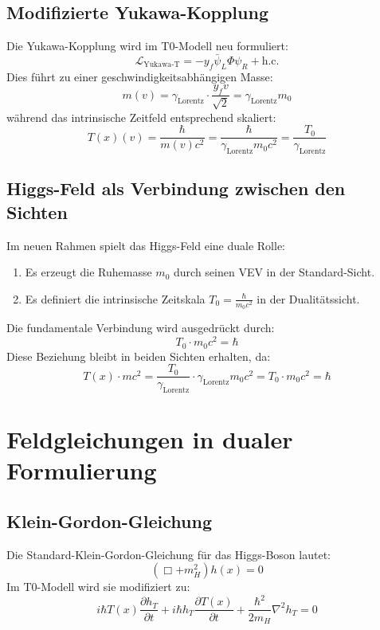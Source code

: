 \documentclass[a4paper,12pt]{article}
\newcommand{\Tfield}{T(x)}
\newcommand{\Tzero}{T_0}
\newcommand{\gammaf}{\gamma_{\text{Lorentz}}}
\begin{document}
	\subsection{Modifizierte Yukawa-Kopplung}
	Die Yukawa-Kopplung wird im T0-Modell neu formuliert:
	\begin{equation}
		\mathcal{L}_{\text{Yukawa-T}} = -y_f \bar{\psi}_L \Phi \psi_R + \text{h.c.}
	\end{equation}
	Dies führt zu einer geschwindigkeitsabhängigen Masse:
	\begin{equation}
		m(v) = \gammaf \cdot \frac{y_f v}{\sqrt{2}} = \gammaf m_0
	\end{equation}
	während das intrinsische Zeitfeld entsprechend skaliert:
	\begin{equation}
		\Tfield(v) = \frac{\hbar}{m(v)c^2} = \frac{\hbar}{\gammaf m_0 c^2} = \frac{\Tzero}{\gammaf}
	\end{equation}
	
	\subsection{Higgs-Feld als Verbindung zwischen den Sichten}
	Im neuen Rahmen spielt das Higgs-Feld eine duale Rolle:
	\begin{enumerate}
		\item Es erzeugt die Ruhemasse \( m_0 \) durch seinen VEV in der Standard-Sicht.
		\item Es definiert die intrinsische Zeitskala \( \Tzero = \frac{\hbar}{m_0 c^2} \) in der Dualitätssicht.
	\end{enumerate}
	Die fundamentale Verbindung wird ausgedrückt durch:
	\begin{equation}
		\Tzero \cdot m_0 c^2 = \hbar
	\end{equation}
	Diese Beziehung bleibt in beiden Sichten erhalten, da:
	\begin{equation}
		\Tfield \cdot m c^2 = \frac{\Tzero}{\gammaf} \cdot \gammaf m_0 c^2 = \Tzero \cdot m_0 c^2 = \hbar
	\end{equation}
	
	\section{Feldgleichungen in dualer Formulierung}
	\subsection{Klein-Gordon-Gleichung}
	Die Standard-Klein-Gordon-Gleichung für das Higgs-Boson lautet:
	\begin{equation}
		(\Box + m_H^2) h(x) = 0
	\end{equation}
	Im T0-Modell wird sie modifiziert zu:
	\begin{equation}
		i\hbar \Tfield \frac{\partial h_T}{\partial t} + i\hbar h_T \frac{\partial \Tfield}{\partial t} + \frac{\hbar^2}{2 m_H} \nabla^2 h_T = 0
	\end{equation}
	
\end{document}
